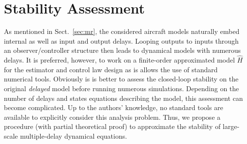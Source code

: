 \documentclass[graybox]{svmult}
\begin{document}
\section{Stability Assessment}\label{sec:st}\vspace{-1mm}
As mentioned in Sect.~\ref{sec:mr}, the considered aircraft models naturally embed internal as well as input and output delays. Looping outputs to inputs through an observer/controller structure then leads to dynamical models with  numerous delays. It is preferred, however, to work on a finite-order approximated model $\hat H$ for the estimator and control law design as is allows the use of standard numerical tools. Obviously is is better to assess the closed-loop stability on the original \textit{delayed} model before running numerous simulations.
Depending on the number of delays and states equations describing the model, this assessment can become complicated. Up to the authors' knowledge, no  standard tools are available to explicitly consider this analysis problem. Thus, we propose a procedure (with partial theoretical proof) to approximate the stability of  large-scale multiple-delay dynamical equations. \vspace{-1mm}
\end{document}
